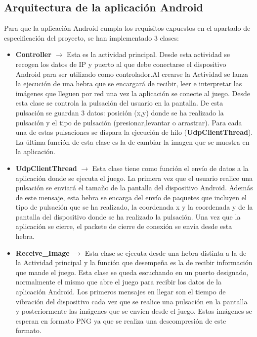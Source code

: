 \subsection {Arquitectura de la aplicaci\'on Android}

Para que la aplicaci\'on Android cumpla los requisitos expuestos en el apartado de especificaci\'on del proyecto, se han implementado 3 clases:

\begin {itemize}
\item \textbf{Controller} $\rightarrow$ Esta es la actividad principal. Desde esta actividad se recogen los datos de IP y puerto al que debe conectarse el dispositivo Android para ser utilizado como controlador.Al crearse la Actividad se lanza la ejecuci\'on de una hebra que se encargar\'a de recibir, leer e interpretar las im\'agenes que lleguen por red una vez la aplicaci\'on se conecte al juego. Desde esta clase se controla la pulsaci\'on del usuario en la pantalla. De esta pulsaci\'on se guardan 3 datos: posici\'on (x,y) donde se ha realizado la pulsaci\'on y el tipo de pulsaci\'on (presionar,levantar o arrastrar). Para cada una de estas pulsaciones se dispara la ejecuci\'on de hilo (\textbf{UdpClientThread}). La \'ultima funci\'on de esta clase es la de cambiar la imagen que se muestra en la aplicaci\'on. 
\item \textbf{UdpClientThread} $\rightarrow$ Esta clase tiene como funci\'on el env\'io de datos a la aplicaci\'on donde se ejecuta el juego. La primera vez que el usuario realice una pulsaci\'on se enviar\'a el tama\~no de la pantalla del dispositivo Android. Adem\'as de este mensaje, esta hebra se encarga del env\'io de paquetes que incluyen el tipo de pulsaci\'on que se ha realizado, la coordenada x y la coordenada y de la pantalla del dispositivo donde se ha realizado la pulsaci\'on. Una vez que la aplicaci\'on se cierre, el packete de cierre de conexi\'on se env\'ia desde esta hebra.
\item \textbf{Receive\_Image} $\rightarrow$ Esta clase se ejecuta desde una hebra distinta a la de la Actividad principal y la funci\'on que desempe\~na es la de recibir informaci\'on que mande el juego. Esta clase se queda escuchando en un puerto designado, normalmente el mismo que abre el juego para recibir los datos de la aplicaci\'on Android. Los primeros mensajes en llegar son el tiempo de vibraci\'on del dispositivo cada vez que se realice una pulsaci\'on en la pantalla y posteriormente las im\'agenes que se env\'ien desde el juego. Estas im\'agenes se esperan en formato PNG ya que se realiza una descompresi\'on de este formato.
\end {itemize}


